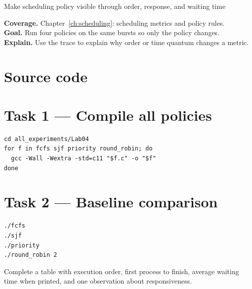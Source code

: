 \begin{labproject}{Make scheduling policy visible through order, response, and waiting time}

\textbf{Coverage.} Chapter~\ref{ch:scheduling}: scheduling metrics and policy rules.\\
\textbf{Goal.} Run four policies on the same bursts so only the policy changes.\\
\textbf{Explain.} Use the trace to explain why order or time quantum changes a metric.

\section*{Source code}








\section*{Task 1 --- Compile all policies}
\begin{lstlisting}[style=utpbash]
cd all_experiments/Lab04
for f in fcfs sjf priority round_robin; do
  gcc -Wall -Wextra -std=c11 "$f.c" -o "$f"
done
\end{lstlisting}

\section*{Task 2 --- Baseline comparison}
\begin{lstlisting}[style=utpbash]
./fcfs
./sjf
./priority
./round_robin 2
\end{lstlisting}
Complete a table with execution order, first process to finish, average waiting time when printed, and one observation about responsiveness.


\end{labproject}
